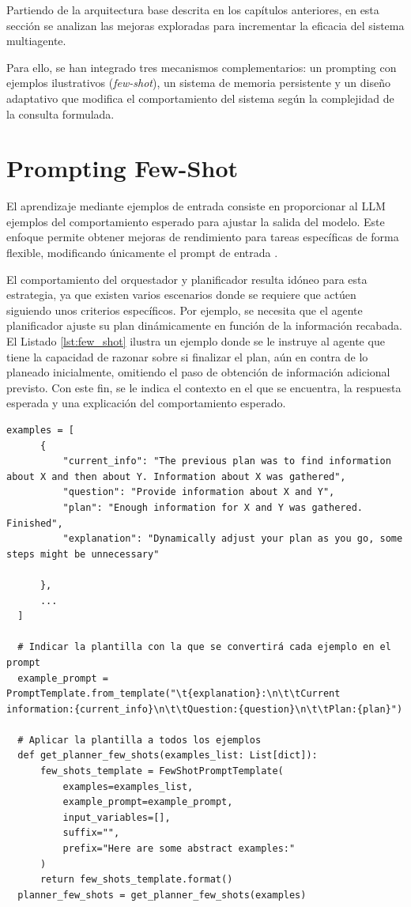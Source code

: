 Partiendo de la arquitectura base descrita en los capítulos anteriores, en esta sección se analizan las mejoras exploradas para incrementar la eficacia del sistema multiagente.

Para ello, se han integrado tres mecanismos complementarios: un prompting con ejemplos ilustrativos (\textit{few-shot}), un sistema de memoria persistente y un diseño adaptativo que modifica el comportamiento del sistema según la complejidad de la consulta formulada.

\section{Prompting Few-Shot}
El aprendizaje mediante ejemplos de entrada consiste en proporcionar al LLM ejemplos del comportamiento esperado para ajustar la salida del modelo. Este enfoque permite obtener mejoras de rendimiento para tareas específicas de forma flexible, modificando únicamente el prompt de entrada \cite{brown_language_2020}.

El comportamiento del orquestador y planificador resulta idóneo para esta estrategia, ya que existen varios escenarios donde se requiere que actúen siguiendo unos criterios específicos. Por ejemplo, se necesita que el agente planificador ajuste su plan dinámicamente en función de la información recabada. El Listado \ref{lst:few_shot} ilustra un ejemplo donde se le instruye al agente que tiene la capacidad de razonar sobre si finalizar el plan, aún en contra de lo planeado inicialmente, omitiendo el paso de obtención de información adicional previsto. Con este fin, se le indica el contexto en el que se encuentra, la respuesta esperada y una explicación del comportamiento esperado.

\begin{lstlisting}[caption={Integración de ejemplos few-shot al agente planificador},label={lst:few_shot}]
  examples = [
      {
          "current_info": "The previous plan was to find information about X and then about Y. Information about X was gathered",
          "question": "Provide information about X and Y",
          "plan": "Enough information for X and Y was gathered. Finished",
          "explanation": "Dynamically adjust your plan as you go, some steps might be unnecessary"

      },
      ...
  ]

  # Indicar la plantilla con la que se convertirá cada ejemplo en el prompt
  example_prompt = PromptTemplate.from_template("\t{explanation}:\n\t\tCurrent information:{current_info}\n\t\tQuestion:{question}\n\t\tPlan:{plan}")

  # Aplicar la plantilla a todos los ejemplos
  def get_planner_few_shots(examples_list: List[dict]):
      few_shots_template = FewShotPromptTemplate(
          examples=examples_list,
          example_prompt=example_prompt,
          input_variables=[],
          suffix="",
          prefix="Here are some abstract examples:"
      )
      return few_shots_template.format()
  planner_few_shots = get_planner_few_shots(examples)
\end{lstlisting}

